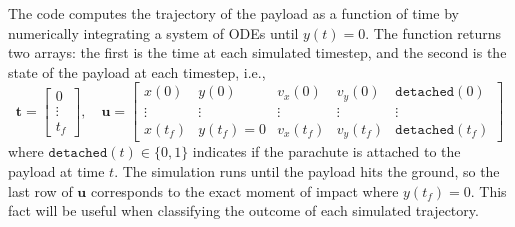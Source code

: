 \documentclass[11pt]{article}
\begin{document}
The code computes the trajectory of the payload as a function of time by numerically integrating a system of ODEs until $y(t)=0$. The function returns two arrays: the first is the time at each simulated timestep, and the second is the state of the payload at each timestep, i.e.,
\[ \mathbf{t}=\begin{bmatrix}0\\\vdots\\t_f\end{bmatrix},\quad
\mathbf{u}=\begin{bmatrix} x(0) & y(0) & v_x(0) & v_y(0) & \texttt{detached}(0) \\
\vdots &\vdots &\vdots &\vdots &\vdots \\
x(t_f) & y(t_f)=0 & v_x(t_f) & v_y(t_f) & \texttt{detached}(t_f)\end{bmatrix}\]
where $\texttt{detached}(t)\in\{0,1\}$ indicates if the parachute is attached to the payload at time $t$. The simulation runs until the payload hits the ground, so the last row of $\mathbf{u}$ corresponds to the exact moment of impact where $y(t_f)=0$. This fact will be useful when classifying the outcome of each simulated trajectory.
\end{document}
